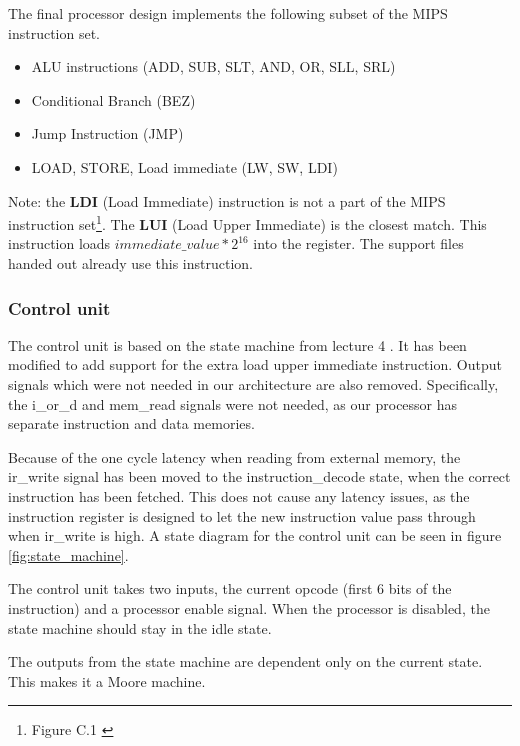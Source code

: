The final processor design implements the following subset of the MIPS instruction set.

\begin{itemize}
    \item ALU instructions (ADD, SUB, SLT, AND, OR, SLL, SRL)
    \item Conditional Branch (BEZ)
    \item Jump Instruction (JMP)
    \item LOAD, STORE, Load immediate (LW, SW, LDI)
\end{itemize}

Note: the {\bf LDI} (Load Immediate) instruction is not a part of the MIPS instruction set\footnote{Figure C.1 \cite[p.66]{compendium}}.
The {\bf LUI} (Load Upper Immediate) is the closest match.
This instruction loads $ immediate\_value * 2 ^{16} $ into the register.
The support files handed out already use this instruction.

\subsubsection{Control unit}

The control unit is based on the state machine from lecture 4 \cite{lecture-4}.
It has been modified to add support for the extra load upper immediate instruction.
Output signals which were not needed in our architecture are also removed.
Specifically, the i\_or\_d and mem\_read signals were not needed, as our processor has separate instruction and data memories.

Because of the one cycle latency when reading from external memory, the ir\_write signal has been moved to the instruction\_decode state, when the correct instruction has been fetched.
This does not cause any latency issues, as the instruction register is designed to let the new instruction value pass through when ir\_write is high.
A state diagram for the control unit can be seen in figure \ref{fig:state_machine}.

The control unit takes two inputs, the current opcode (first 6 bits of the instruction) and a processor enable signal.
When the processor is disabled, the state machine should stay in the idle state.

The outputs from the state machine are dependent only on the current state.
This makes it a Moore machine.

